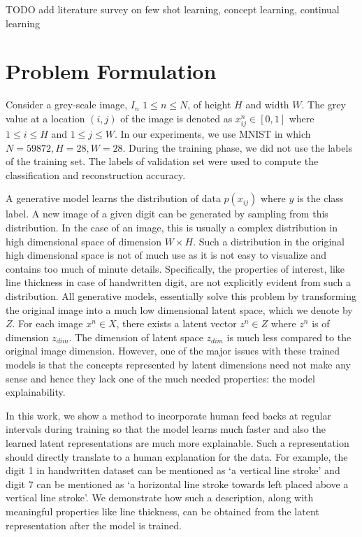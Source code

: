 \documentclass[journal]{IEEEtran}
\begin{document}
TODO add literature survey on few shot learning, concept learning, continual learning

\section{Problem Formulation} \label{problem_formulation}
Consider a grey-scale image, $I_n$  $1\leq n \leq N$,  of height  $H$ and width $W$. The grey value at a location $(i, j)$ of the image is denoted  as $x_{ij}^{n} \in [0,1]$  where $1 \leq i \leq H$  and  $1\leq j \leq W$. In our experiments, we use MNIST in which $N= 59872, H=28,  W= 28$. During the training phase, we did not use the labels of the training set. The labels of validation set were used to compute the classification and reconstruction accuracy.
 
 A generative model learns the distribution of data $p(x_{ij})$ where $y$ is the class label. A new image of a given digit can be generated by sampling from this distribution. In the case of an image, this is usually a complex distribution in high dimensional space of dimension $W \times H$. Such a distribution in the original high dimensional space is not of much use as it is not easy to visualize and contains too much of  minute details. Specifically, the properties of interest, like line thickness in case of handwritten digit, are not explicitly evident from such a distribution.   All generative models, essentially solve this problem by transforming the original image into a much low dimensional latent space, which we denote by  $Z$. For each image $x^n \in X$, there exists a latent vector  $z^n \in Z$  where $z^n$ is of dimension $z_{dim}$. The dimension of latent space $z_{dim}$ is much less compared to the original image dimension. However, one of the major issues with these trained models is that the concepts represented by latent dimensions need not make any sense and hence they lack one of the much needed properties: the model explainability.
 
  In this work, we show a method to incorporate human feed backs at regular intervals during training so that the model learns much faster and also the learned latent representations are much more explainable. Such a representation should directly translate to a human explanation for the data. For example, the digit 1 in  handwritten dataset  can be mentioned as  `a vertical line stroke'  and digit 7 can be mentioned as `a horizontal line stroke towards left placed  above a vertical line stroke'. We demonstrate how  such a description, along with meaningful properties like line thickness, can be obtained from the latent representation after the model is trained.
 
\end{document}
